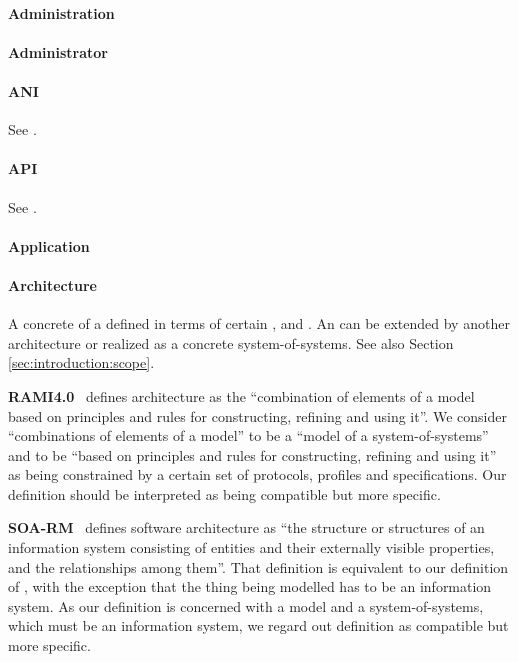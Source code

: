 %
%

{

\newcommand{\GlossaryEntry}[2]{\paragraph{#1}\label{sec:glossary:#2}}
\newcommand{\GlossarySourceNote}[2]{\begin{minipage}[b]{\dimexpr\linewidth-0.5cm\relax}\vspace*{0.33cm}\footnotesize{\textbf{#1}\ #2}\end{minipage}}

\GlossaryEntry{Administration}{administration}

\GlossaryEntry{Administrator}{administrator}

\GlossaryEntry{ANI}{ani}
See .

\GlossaryEntry{API}{api}
See .

\GlossaryEntry{Application}{application}

\GlossaryEntry{Architecture}{architecture}
A concrete  of a  defined in terms of certain ,  and .
An  can be extended by another architecture or realized as a concrete system-of-systems.
See also Section \ref{sec:introduction:scope}.

	\GlossarySourceNote{RAMI4.0}{
	    defines architecture as the ``combination of elements of a model based on principles and rules for constructing, refining and using it''.
		We consider ``combinations of elements of a model'' to be a ``model of a system-of-systems'' and to be ``based on principles and rules for constructing, refining and using it'' as being constrained by a certain set of protocols, profiles and specifications.
		Our definition should be interpreted as being compatible but more specific.
	}

	\GlossarySourceNote{SOA-RM}{
		defines software architecture as ``the structure or structures of an information system consisting of entities and their externally visible properties, and the relationships among them''.
		That definition is equivalent to our definition of \GlossaryHyperRef{model}{model}, with the exception that the thing being modelled has to be an information system.
		As our definition is concerned with a model and a system-of-systems, which must be an information system, we regard out definition as compatible but more specific.
	}

}
